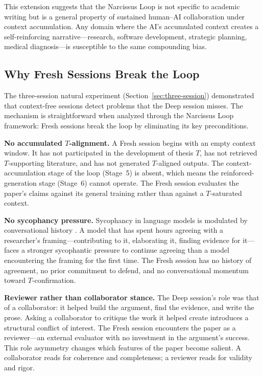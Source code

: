 \documentclass[12pt]{article}
\begin{document}
This extension suggests that the Narcissus Loop is not specific to academic writing but is a general property of sustained human--AI collaboration under context accumulation. Any domain where the AI's accumulated context creates a self-reinforcing narrative---research, software development, strategic planning, medical diagnosis---is susceptible to the same compounding bias.

\subsection{Why Fresh Sessions Break the Loop}
\label{sec:fresh-sessions}

The three-session natural experiment (Section~\ref{sec:three-session}) demonstrated that context-free sessions detect problems that the Deep session misses. The mechanism is straightforward when analyzed through the Narcissus Loop framework: Fresh sessions break the loop by eliminating its key preconditions.

\textbf{No accumulated $T$-alignment.} A Fresh session begins with an empty context window. It has not participated in the development of thesis $T$, has not retrieved $T$-supporting literature, and has not generated $T$-aligned outputs. The context-accumulation stage of the loop (Stage~5) is absent, which means the reinforced-generation stage (Stage~6) cannot operate. The Fresh session evaluates the paper's claims against its general training rather than against a $T$-saturated context.

\textbf{No sycophancy pressure.} Sycophancy in language models is modulated by conversational history \citep{sharma2023}. A model that has spent hours agreeing with a researcher's framing---contributing to it, elaborating it, finding evidence for it---faces a stronger sycophantic pressure to continue agreeing than a model encountering the framing for the first time. The Fresh session has no history of agreement, no prior commitment to defend, and no conversational momentum toward $T$-confirmation.

\textbf{Reviewer rather than collaborator stance.} The Deep session's role was that of a collaborator: it helped build the argument, find the evidence, and write the prose. Asking a collaborator to critique the work it helped create introduces a structural conflict of interest. The Fresh session encounters the paper as a reviewer---an external evaluator with no investment in the argument's success. This role asymmetry changes which features of the paper become salient. A collaborator reads for coherence and completeness; a reviewer reads for validity and rigor.
\end{document}

